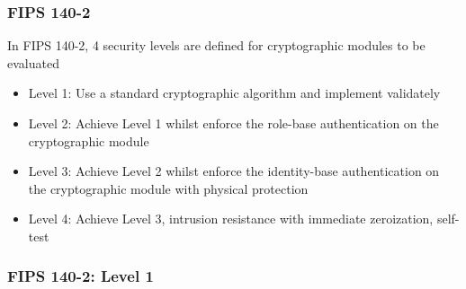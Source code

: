 \documentclass{beamer}
\begin{document}
\frame
{
\frametitle{FIPS 140-2}
In FIPS 140-2, 4 security levels are defined for cryptographic modules to be evaluated
\begin{itemize}
\setlength{\itemsep}{6pt}
\item Level 1:  Use a standard cryptographic algorithm and implement validately

\item Level 2: Achieve Level 1 whilst enforce the role-base authentication on the cryptographic module

\item Level 3: Achieve Level 2 whilst enforce the identity-base authentication on the cryptographic module with physical protection

\item Level 4: Achieve Level 3, intrusion resistance with immediate zeroization, self-test
\end{itemize}

}

\frame
{
\frametitle{FIPS 140-2: Level 1}

\begin{center}
\end{center}

}
\end{document}

